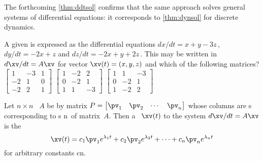 The forthcoming \autoref{thm:ddtsol} confirms that the same approach solves general systems of differential equations: it corresponds to \autoref{thm:dynsol} for discrete dynamics.



\begin{activity}
A given  is expressed as the differential equations \(dx/dt=x+y-3z\)\,, \(dy/dt=-2x+z\) and \(dz/dt=-2x+y+2z\)\,.
This may be written in  \(d\xv/dt=A\xv\) for vector \(\xv(t)=(x,y,z)\) and which of the following matrices?
{\(\begin{bmatrix} 1&-3&1
\\-2&1&0
\\-2&2&1 \end{bmatrix}\)}
{\(\begin{bmatrix} 1&-2&2
\\0&-2&1
\\1&1&-3 \end{bmatrix}\)}
{\(\begin{bmatrix} 1&1&-3
\\0&-2&1
\\1&-2&2 \end{bmatrix}\)}
\end{activity}




\begin{theorem} \label{thm:ddtsol}
Let \(n\times n\) ~\(A\) be  by matrix \(P=\begin{bmatrix} \pv_1&\pv_2&\cdots&\pv_n \end{bmatrix}\) whose columns are s corresponding to s \hlist\lambda n\ of matrix~\(A\).  
Then a ~\(\xv(t)\) to the  system \(d\xv/dt=A\xv\) is the 
\begin{equation}
\xv(t)=c_1\pv_1e^{\lambda_1t}+c_2\pv_2e^{\lambda_2t}+\cdots+c_n\pv_ne^{\lambda_nt}
\label{eq:ddtsol}
\end{equation}
for arbitrary constants \hlist cn.
\end{theorem}

